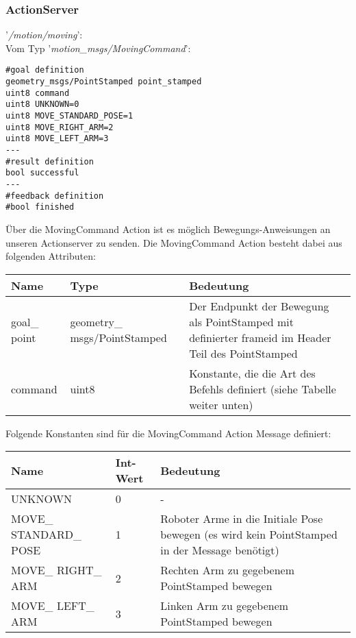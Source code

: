 \documentclass{suturo}
\begin{document}
\subsubsection{ActionServer}
'\textit{/motion/moving}': \\
Vom Typ '\textit{motion\_msgs/MovingCommand}': \\
\begin{lstlisting}[caption={Definition der MovingCommandAction},captionpos=b]
#goal definition
geometry_msgs/PointStamped point_stamped
uint8 command
uint8 UNKNOWN=0
uint8 MOVE_STANDARD_POSE=1
uint8 MOVE_RIGHT_ARM=2
uint8 MOVE_LEFT_ARM=3
---
#result definition
bool successful
---
#feedback definition
#bool finished
\end{lstlisting}

Über die MovingCommand Action ist es möglich Bewegungs-Anweisungen an unseren Actionserver zu senden. Die MovingCommand Action besteht dabei aus folgenden Attributen:
\begin{center}
	\begin{tabular}{ l | l | p{7cm}}
		Name & Type & Bedeutung \\ \hline
		goal\_ point & geometry\_ msgs/PointStamped & Der Endpunkt der Bewegung als PointStamped mit definierter frameid im Header Teil des PointStamped \\ \hline
		command & uint8 & Konstante, die die Art des Befehls definiert (siehe Tabelle weiter unten) \\
	\end{tabular}
\end{center}
  
Folgende Konstanten sind für die MovingCommand Action Message definiert:

\begin{center}
	\begin{tabular}{ l | l | p{7cm}}
		Name & Int-Wert & Bedeutung \\ \hline
		UNKNOWN & 0 & - \\ \hline
		MOVE\_ STANDARD\_ POSE & 1 & Roboter Arme in die Initiale Pose bewegen (es wird kein PointStamped in der Message benötigt) \\ \hline
		MOVE\_ RIGHT\_ ARM & 2 & Rechten Arm zu gegebenem PointStamped bewegen \\ \hline
		MOVE\_ LEFT\_ ARM & 3 & Linken Arm zu gegebenem PointStamped bewegen \\
	\end{tabular}
\end{center}
\end{document}
